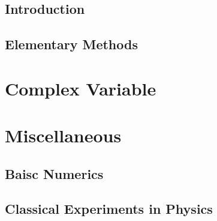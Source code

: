 \documentclass{article}
\begin{document}
\subsection{Introduction}



\subsection{Elementary Methods}







\section{Complex Variable}





\section{Miscellaneous}

\subsection{Baisc Numerics}



\subsection{Classical Experiments in Physics}


\end{document}

